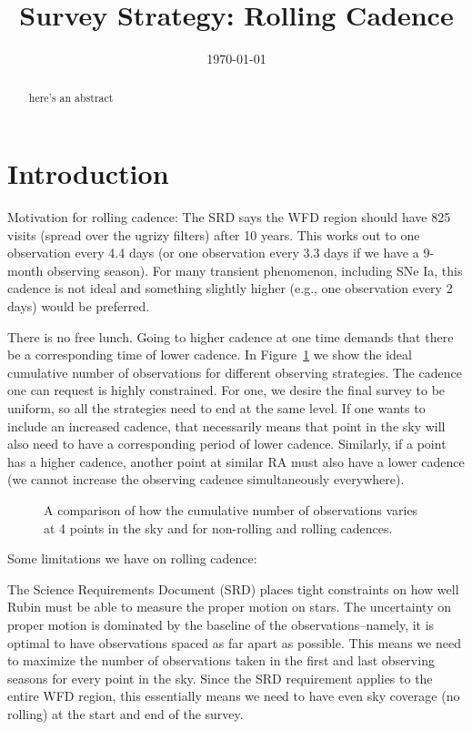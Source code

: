 \documentclass[modern]{aastex62}
\begin{document}

\date{\today}
\title{Survey Strategy: Rolling Cadence}

\begin{abstract}
here's an abstract
\end{abstract}

\section{Introduction}

Motivation for rolling cadence:  The SRD says the WFD region should have 825 visits (spread over the ugrizy filters) after 10 years. This works out to one observation every 4.4 days (or one observation every 3.3 days if we have a 9-month observing season). For many transient phenomenon, including SNe Ia, this cadence is not ideal and something slightly higher (e.g., one observation every 2 days) would be preferred.

There is no free lunch. Going to higher cadence at one time demands that there be a corresponding time of lower cadence. In Figure~\ref{fig:ideal_foot} we show the ideal cumulative number of observations for different observing strategies. The cadence one can request is highly constrained. For one, we desire the final survey to be uniform, so all the strategies need to end at the same level. If one wants to include an increased cadence, that necessarily means that point in the sky will also need to have a corresponding period of lower cadence. Similarly, if a point has a higher cadence, another point at similar RA must also have a lower cadence (we cannot increase the observing cadence simultaneously everywhere).



\begin{figure}
\caption{A comparison of how the cumulative number of observations varies at 4 points in the sky and for non-rolling and rolling cadences. \label{fig:ideal_foot}}
\end{figure}

\begin{figure}
\caption{\label{fig:actual_foot}}
\end{figure}

Some limitations we have on rolling cadence:

The Science Requirements Document (SRD) places tight constraints on how well Rubin must be able to measure the proper motion on stars. The uncertainty on proper motion is dominated by the baseline of the observations--namely, it is optimal to have observations spaced as far apart as possible. This means we need to maximize the number of observations taken in the first and last observing seasons for every point in the sky. Since the SRD requirement applies to the entire WFD region, this essentially means we need to have even sky coverage (no rolling) at the start and end of the survey. 
\end{document}
